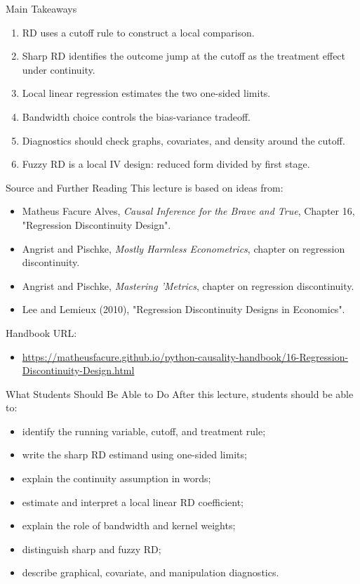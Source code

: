 \documentclass[11pt,aspectratio=169]{beamer}
\begin{document}
\begin{frame}{Main Takeaways}
  \begin{enumerate}
    \item RD uses a cutoff rule to construct a local comparison.
    \item Sharp RD identifies the outcome jump at the cutoff as the treatment effect under continuity.
    \item Local linear regression estimates the two one-sided limits.
    \item Bandwidth choice controls the bias-variance tradeoff.
    \item Diagnostics should check graphs, covariates, and density around the cutoff.
    \item Fuzzy RD is a local IV design: reduced form divided by first stage.
  \end{enumerate}
\end{frame}

\begin{frame}{Source and Further Reading}
  This lecture is based on ideas from:
  \begin{itemize}
    \item Matheus Facure Alves, \emph{Causal Inference for the Brave and True}, Chapter 16, "Regression Discontinuity Design".
    \item Angrist and Pischke, \emph{Mostly Harmless Econometrics}, chapter on regression discontinuity.
    \item Angrist and Pischke, \emph{Mastering 'Metrics}, chapter on regression discontinuity.
    \item Lee and Lemieux (2010), "Regression Discontinuity Designs in Economics".
  \end{itemize}
  \vspace{0.3em}
  Handbook URL:
  \begin{itemize}
    \item \url{https://matheusfacure.github.io/python-causality-handbook/16-Regression-Discontinuity-Design.html}
  \end{itemize}
\end{frame}

\begin{frame}{What Students Should Be Able to Do}
  After this lecture, students should be able to:
  \begin{itemize}
    \item identify the running variable, cutoff, and treatment rule;
    \item write the sharp RD estimand using one-sided limits;
    \item explain the continuity assumption in words;
    \item estimate and interpret a local linear RD coefficient;
    \item explain the role of bandwidth and kernel weights;
    \item distinguish sharp and fuzzy RD;
    \item describe graphical, covariate, and manipulation diagnostics.
  \end{itemize}
\end{frame}
\end{document}
